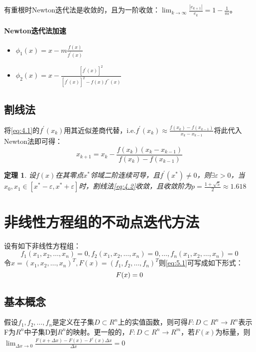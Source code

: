\documentclass[a4paper]{article}
\newtheorem{theorem}{定理}[section]
\begin{document}
有重根时Newton迭代法是收敛的，且为一阶收敛：$\lim_{k\rightarrow \infty}\frac{|e_{k+1}|}{e_k}=1-\frac{1}{m}$。

\paragraph{Newton迭代法加速}
\begin{itemize}
    \item $\phi_1(x)=x-m\frac{f(x)}{f^{'}(x)}$
    \item $\phi_2(x)=x-\frac{[f^{'}(x)]^2}{[f^{'}(x)]^2-f(x)f^{{'}{'}}(x)}$
\end{itemize}

\subsection{割线法}

将\ref{eq:4.1}的$f^{'}(x_k) $用其近似差商代替，i.e.$f^{'}(x_k)\approx \frac{f(x_k)-f(x_{k-1})}{x_k-x_{k-1}}$将此代入Newton法即可得：
\begin{equation}
    x_{k+1}=x_k-\frac{f(x_k)(x_k-x_{k-1})}{f(x_k)-f(x_{k-1})}
    \label{eq:4.2}
\end{equation}
\begin{theorem}
    设$f(x)$在其零点$x^*$邻域二阶连续可导，且$f^{'}(x^*)\neq 0$，则$\exists \varepsilon >0$，当$x_0, x_1\in [x^*-\varepsilon, x^*+\varepsilon]$时，割线法\ref{eq:4.2}收敛，且收敛阶为$p=\frac{1+\sqrt{5}}{2}\approx 1.618$
\end{theorem}

\section{非线性方程组的不动点迭代方法}
设有如下非线性方程组：
\begin{equation}
    f_1(x_1,x_2,\dots, x_n)=0,f_2(x_1,x_2,\dots, x_n)=0,\dots, f_n(x_1, x_2, \dots, x_n)=0
    \label{eq:5.1}
\end{equation}
令$x=(x_1, x_2, \dots, x_n)^T, F(x)=(f_1, f_2, \dots, f_n)^T$则\ref{eq:5.1}可写成如下形式：
\begin{equation}
    F(x)=0\\
    \label{eq:5.2}
\end{equation}

\subsection{基本概念}
假设$f_1, f_2, \dots, f_n$是定义在子集$D\subset R^n$上的实值函数，则可得$F:D\subset R^n\rightarrow R^n$表示
F为$R^n$中子集D到$R^n$的映射。更一般的，$F:D\subset R^n\rightarrow R^m$，若$F(x)$为标量，则$\lim_{\Delta x\rightarrow 0}\frac{F(x+\Delta x)-F(x)-F^{'}(x)\Delta x}{\Delta x}=0 $
\end{document}
